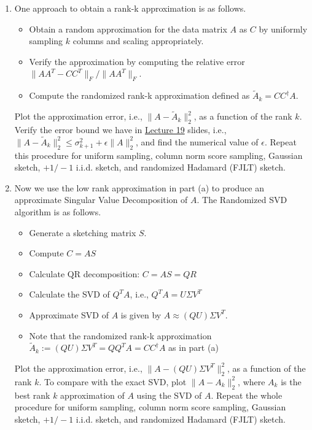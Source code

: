 \begin{enumerate}
\begin{enumerate}
    \item One approach to obtain a rank-k approximation is as follows.
    \begin{itemize}
    \item Obtain a random approximation for the data matrix $A$ as $C$ by uniformly sampling $k$ columns and scaling appropriately.
    \item Verify the approximation by computing the relative error $\|AA^T- CC^T\|_F/\|AA^T\|_F$.
    \item Compute the randomized rank-k approximation defined as $\tilde{A}_k=C C^{\dagger}A$.

\end{itemize}
     Plot the approximation error, i.e., $\|A-\tilde{A}_k\|_2^2$, as a function of the rank $k$. Verify the error bound we have in \href{https://web.stanford.edu/class/ee270/Lecture19.pdf}{Lecture 19} slides, i.e., $\|A-\tilde{A}_k\|_2^2\leq \sigma_{k+1}^2+\epsilon \|A\|_2^2$, and find the numerical value of $\epsilon$. Repeat this procedure for uniform sampling, column norm score sampling, Gaussian sketch, $+1/-1$ i.i.d. sketch, and randomized Hadamard (FJLT) sketch.
\item Now we use the low rank approximation in part (a) to produce an approximate Singular Value Decomposition of $A$. The Randomized SVD algorithm is as follows.
\begin{itemize}
    \item Generate a sketching matrix $S$.
    \item Compute $C=AS$
    \item Calculate QR decomposition: $C=AS=QR$
    \item Calculate the SVD of $Q^T A$, i.e., $Q^T A= U \Sigma V^T$
    \item Approximate SVD of $A$ is given by $A \approx (QU)\Sigma V^T$.
    \item Note that the randomized rank-k approximation $\tilde A_k:=(QU)\Sigma V^T= QQ^T A = CC^\dagger A$ as in part (a)
\end{itemize}
  Plot the approximation error, i.e., $\|A- (QU)\Sigma V^T\|_2^2$, as a function of the rank $k$. To compare with the exact SVD, plot $\|A-A_k\|_2^2$, where $A_k$ is the best rank $k$ approximation of $A$ using the SVD of $A$. Repeat the whole procedure for uniform sampling, column norm score sampling, Gaussian sketch, $+1/-1$ i.i.d. sketch, and randomized Hadamard (FJLT) sketch.
\end{enumerate}
\solution{
}




\end{enumerate}
